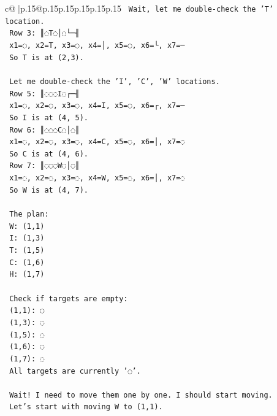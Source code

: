 \documentclass{article}
\begin{document}
{\begin{supertabular}{c@{$\;$}|p{.15\linewidth}@{}p{.15\linewidth}p{.15\linewidth}p{.15\linewidth}p{.15\linewidth}p{.15\linewidth}}
{{{\texttt{        Wait, let me double{-}check the 'T' location.} \\
\texttt{        Row 3: ║◌T◌│◌└─╢} \\
\texttt{        x1=◌, x2=T, x3=◌, x4=│, x5=◌, x6=└, x7=─} \\
\texttt{        So T is at (2,3).} \\
\\ 
\texttt{        Let me double{-}check the 'I', 'C', 'W' locations.} \\
\texttt{        Row 5: ║◌◌◌I◌┌─╢} \\
\texttt{        x1=◌, x2=◌, x3=◌, x4=I, x5=◌, x6=┌, x7=─} \\
\texttt{        So I is at (4, 5).} \\
\texttt{        Row 6: ║◌◌◌C◌│◌║} \\
\texttt{        x1=◌, x2=◌, x3=◌, x4=C, x5=◌, x6=│, x7=◌} \\
\texttt{        So C is at (4, 6).} \\
\texttt{        Row 7: ║◌◌◌W◌│◌║} \\
\texttt{        x1=◌, x2=◌, x3=◌, x4=W, x5=◌, x6=│, x7=◌} \\
\texttt{        So W is at (4, 7).} \\
\\ 
\texttt{        The plan:} \\
\texttt{        W: (1,1)} \\
\texttt{        I: (1,3)} \\
\texttt{        T: (1,5)} \\
\texttt{        C: (1,6)} \\
\texttt{        H: (1,7)} \\
\\ 
\texttt{        Check if targets are empty:} \\
\texttt{        (1,1): ◌} \\
\texttt{        (1,3): ◌} \\
\texttt{        (1,5): ◌} \\
\texttt{        (1,6): ◌} \\
\texttt{        (1,7): ◌} \\
\texttt{        All targets are currently '◌'.} \\
\\ 
\texttt{        Wait! I need to move them one by one. I should start moving.} \\
\texttt{        Let's start with moving W to (1,1).} \\
\\ 
}}}
\end{supertabular}}
\end{document}
